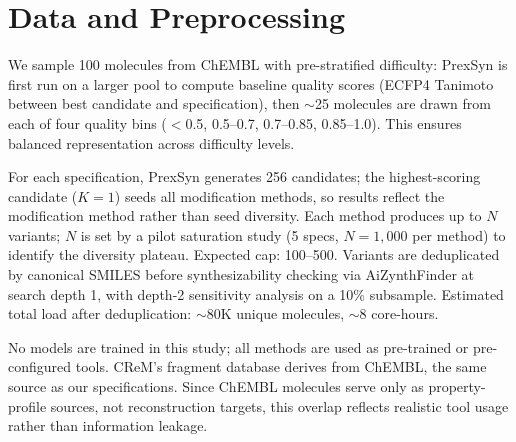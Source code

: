 \section*{Data and Preprocessing}

We sample 100 molecules from ChEMBL with pre-stratified difficulty: PrexSyn is first run on a larger pool to compute baseline quality scores (ECFP4 Tanimoto between best candidate and specification), then $\sim$25 molecules are drawn from each of four quality bins ($<$0.5, 0.5--0.7, 0.7--0.85, 0.85--1.0). This ensures balanced representation across difficulty levels.

For each specification, PrexSyn generates 256 candidates; the highest-scoring candidate ($K=1$) seeds all modification methods, so results reflect the modification method rather than seed diversity. Each method produces up to $N$ variants; $N$ is set by a pilot saturation study (5 specs, $N=1,000$ per method) to identify the diversity plateau. Expected cap: 100--500. Variants are deduplicated by canonical SMILES before synthesizability checking via AiZynthFinder at search depth 1, with depth-2 sensitivity analysis on a 10\% subsample. Estimated total load after deduplication: $\sim$80K unique molecules, $\sim$8 core-hours.

No models are trained in this study; all methods are used as pre-trained or pre-configured tools. CReM's fragment database derives from ChEMBL, the same source as our specifications. Since ChEMBL molecules serve only as property-profile sources, not reconstruction targets, this overlap reflects realistic tool usage rather than information leakage.
